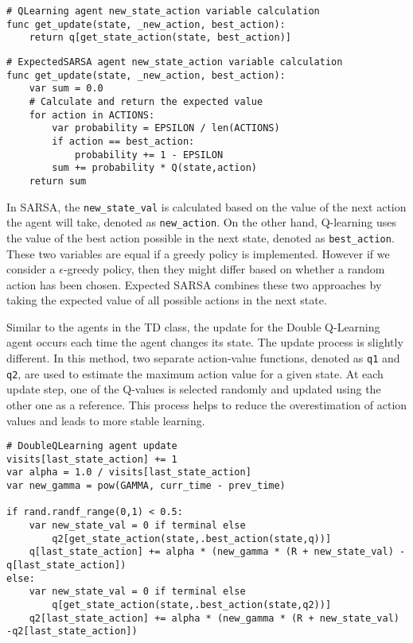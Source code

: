 \begin{center}
\hrulefill
\begin{lstlisting}
# QLearning agent new_state_action variable calculation
func get_update(state, _new_action, best_action):
    return q[get_state_action(state, best_action)]
\end{lstlisting}
\hrulefill
\end{center}

\begin{center}
\hrulefill
\begin{lstlisting}
# ExpectedSARSA agent new_state_action variable calculation
func get_update(state, _new_action, best_action):
    var sum = 0.0 
    # Calculate and return the expected value 
    for action in ACTIONS:
        var probability = EPSILON / len(ACTIONS)
        if action == best_action:
            probability += 1 - EPSILON
        sum += probability * Q(state,action)
    return sum
\end{lstlisting}
\hrulefill
\end{center}

In SARSA, the \texttt{new\_state\_val} is calculated based on the value of the next action the agent will take, denoted as \texttt{new\_action}. On the other hand, Q-learning uses the value of the best action possible in the next state, denoted as \texttt{best\_action}. These two variables are equal if a greedy policy is implemented. However if we consider a $\epsilon$-greedy policy, then they might differ based on whether a random action has been chosen. Expected SARSA combines these two approaches by taking the expected value of all possible actions in the next state. 

Similar to the agents in the TD class, the update for the Double Q-Learning agent occurs each time the agent changes its state. The update process is slightly different. In this method, two separate action-value functions, denoted as \texttt{q1} and \texttt{q2}, are used to estimate the maximum action value for a given state. At each update step, one of the Q-values is selected randomly and updated using the other one as a reference. This process helps to reduce the overestimation of action values and leads to more stable learning.

\begin{center}
\hrulefill
\begin{lstlisting}
# DoubleQLearning agent update
visits[last_state_action] += 1
var alpha = 1.0 / visits[last_state_action]
var new_gamma = pow(GAMMA, curr_time - prev_time)

if rand.randf_range(0,1) < 0.5:
    var new_state_val = 0 if terminal else
        q2[get_state_action(state,.best_action(state,q))]
    q[last_state_action] += alpha * (new_gamma * (R + new_state_val) -q[last_state_action])
else:
    var new_state_val = 0 if terminal else
        q[get_state_action(state,.best_action(state,q2))]
    q2[last_state_action] += alpha * (new_gamma * (R + new_state_val) -q2[last_state_action])
\end{lstlisting}
\hrulefill
\end{center}